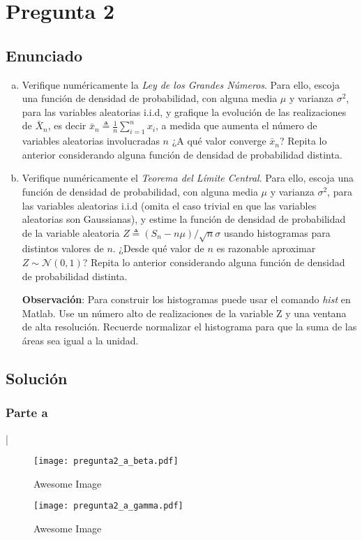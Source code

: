 \section{ Pregunta 2 }
	\subsection{ Enunciado }
		\begin{enumerate}[a)]
			\item Verifique numéricamente la \textit{Ley de los Grandes Números}. Para ello, escoja una función de densidad de probabilidad, con alguna media $\mu$ y varianza $\sigma^2$, para las variables aleatorias i.i.d, y grafique la evolución de las realizaciones de $\bar X_n$, es decir $\bar x_n \triangleq \frac{1}{n}\sum_{i=1}^n x_i$, a medida que aumenta el número de variables aleatorias involucradas $n$ ¿A qué valor converge $\bar x_n$? Repita lo anterior considerando alguna función de densidad de probabilidad distinta.


			\item Verifique numéricamente el \textit{Teorema del Límite Central}. Para ello, escoja una función de densidad de probabilidad, con alguna media $\mu$ y varianza $\sigma^2$, para las variables aleatorias i.i.d (omita el caso trivial en que las variables aleatorias son Gaussianas), y estime la función de densidad de probabilidad de la variable aleatoria $Z\triangleq (S_n -n\mu)/\sqrt{n}\sigma$ usando histogramas para distintos valores de $n$. ¿Desde qué valor de $n$ es razonable aproximar $Z \sim \mathcal{ N } (0, 1)$? Repita lo anterior considerando alguna función de densidad de probabilidad distinta.

			\textbf{Observación}: Para construir los histogramas puede usar el comando \textit{hist} en Matlab. Use un número alto de realizaciones de la variable Z y  una ventana de alta resolución. Recuerde normalizar el histograma para que la suma de las áreas sea igual a la unidad. 
		\end{enumerate}

	\subsection{ Solución }

		\subsubsection {Parte a}
		|

			\begin{figure}[H]
			    \centering
			    \texttt{[image: pregunta2\_a\_beta.pdf]}
			    \caption{Awesome Image}
			    \label{fig:2_a_beta}
			\end{figure}
			\begin{figure}[H]
			    \centering
			    \texttt{[image: pregunta2\_a\_gamma.pdf]}
			    \caption{Awesome Image}
			    \label{fig:2_a_gamma}
			\end{figure}